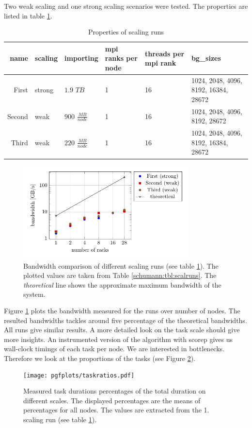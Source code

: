 Two weak scaling and one strong scaling scenarios were tested.
The properties are listed in table \ref{schumann:tbl:runs}.
\begin{table}[h!]
  \caption{Properties of scaling runs}
\begin{center}
\begin{tabular}{|r|l|p{1.5cm}|p{1.4cm}|p{1.4cm}|p{3cm}|}
\hline
name & scaling & importing & mpi ranks per node & threads per mpi rank & bg\_sizes \\
\hline\hline
First    &  strong  & $1.9$ $TB$             & 1 & 16 & 1024, 2048, 4096, 8192, 16384, 28672 \\
Second    &  weak  & $900$ $\frac{MB}{node}$      & 1 & 16 & 1024, 2048, 4096, 8192, 28672 \\
Third    &  weak  & $220$ $\frac{MB}{node}$     & 1 & 16 & 1024, 2048, 4096, 8192, 16384, 28672 \\
\hline
\end{tabular}
\end{center}
\label{schumann:tbl:runs}
\end{table}
\begin{figure}[h!]
\begin{center}
 \includegraphics[width=0.8\textwidth]{pgfplots/bandwidth.pdf}
\end{center}
\caption{Bandwidth comparison of different scaling runs (see table \ref{schumann:tbl:runs}).
The plotted values are taken from Table \ref{schumann:tbl:scalruns}.
The \emph{theoretical} line shows the approximate maximum bandwidth of the system.}
\label{schumann:fig:bandwidth}
\end{figure}
Figure \ref{schumann:fig:bandwidth} plots the bandwidth measured for the runs over number of nodes.
The resulted bandwidths tackles around five percentage of the theoretical bandwidths.
All runs give similar results.
A more detailed look on the task scale should give more insights.
An instrumented version of the algorithm with scorep gives us wall-clock timings of each task per node.
We are interested in bottlenecks.
Therefore we look at the proportions of the tasks (see Figure \ref{schumann:fig:taskratios}).
\begin{figure}[h!]
\begin{center}
 \texttt{[image: pgfplots/taskratios.pdf]}
\end{center}
\caption{Measured task durations percentages of the total duration on different scales.
 The displayed percentages are the means of percentages for all nodes.
 The values are extracted from the 1. scaling run (see table \ref{schumann:tbl:runs}).
 }
\label{schumann:fig:taskratios}
\end{figure}

